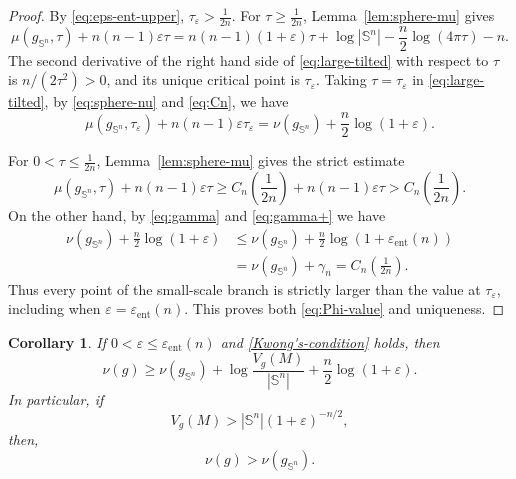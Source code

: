 \documentclass[11pt, reqno]{amsart}
\numberwithin{equation}{section}
\newtheorem{corollary}[theorem]{Corollary}
\theoremstyle{remark}
\newcommand{\Sph}{\mathbb S}
\newcommand{\eps}{\varepsilon}
\newcommand{\ent}{\mathrm{ent}}
\begin{document}
\begin{proof}
By \eqref{eq:eps-ent-upper}, $\tau_\eps>\frac{1}{2n}$. For $\tau\geq\frac{1}{2n}$,
Lemma~\ref{lem:sphere-mu} gives
\begin{equation}\label{eq:large-tilted}
\mu(g_{\Sph^n},\tau)+n(n-1)\eps\tau
=n(n-1)(1+\eps)\tau+\log |\Sph^n|
-\frac n2\log(4\pi\tau)-n.
\end{equation}
The second derivative of the right hand side of \eqref{eq:large-tilted} with respect to $\tau$ is $n/(2\tau^2)>0$, and its unique critical point is
$\tau_\eps$. Taking $\tau=\tau_\eps$ in \eqref{eq:large-tilted}, by \eqref{eq:sphere-nu} and \eqref{eq:Cn},  we have
\begin{equation}\label{eq:large-tilted-value}
\mu(g_{\Sph^n},\tau_\eps)+n(n-1)\eps\tau_\eps
=\nu(g_{\Sph^n})+\frac n2\log(1+\eps).
\end{equation}

For $0<\tau\leq\frac{1}{2n}$, Lemma~\ref{lem:sphere-mu} gives the strict estimate
\begin{equation}\label{eq:small-tilted-strict}
\mu(g_{\Sph^n},\tau)+n(n-1)\eps\tau
\geq C_n\left(\frac{1}{2n}\right)+n(n-1)\eps\tau>C_n\left(\frac{1}{2n}\right).
\end{equation}
On the other hand, by \eqref{eq:gamma} and \eqref{eq:gamma+} we have
\begin{align*}
\nu(g_{\Sph^n})+\frac n2\log(1+\eps)
&\leq\nu(g_{\Sph^n})+\frac n2\log(1+\eps_{\ent}(n))\\
&=\nu(g_{\Sph^n})+\gamma_n=C_n\left(\frac{1}{2n}\right).
\end{align*}
Thus every point of the small-scale branch is strictly larger than the value at
$\tau_\eps$, including when $\eps=\eps_{\ent}(n)$. This proves both
\eqref{eq:Phi-value} and uniqueness.
\end{proof}

\begin{corollary}
\label{cor:entropy-lower}
If $0<\eps\leq\eps_{\ent}(n)$ and \eqref{Kwong's-condition} holds, then
\begin{equation}\label{eq:entropy-sharp-factor}
\nu(g)\geq\nu(g_{\Sph^n})+\log\frac{V_g(M)}{|\Sph^n|}
+\frac n2\log(1+\eps).
\end{equation}
In particular, if
\begin{equation}\label{eq:volume-violation-entropy-0}
V_g(M)>|\Sph^n|(1+\eps)^{-n/2},
\end{equation}
then,
\begin{equation}\label{eq:volume-violation-entropy}
\nu(g)>\nu(g_{\Sph^n}).
\end{equation}
\end{corollary}
\end{document}
